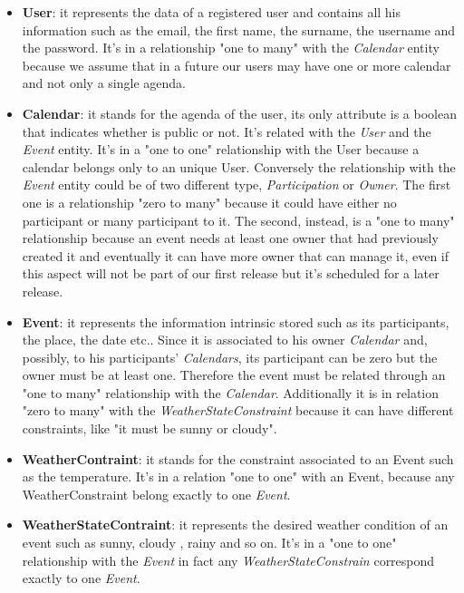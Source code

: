 \begin{itemize}
\item{\bf User}: it represents the data of a registered user and contains all his information such as the email, the first name, the surname, the username and the password. It's in a relationship "one to many" with the \textit{Calendar} entity because we assume that in a future our users may have one or more calendar and not only a single agenda.
\item{\bf Calendar}: it stands for the agenda of the user, its only attribute is a boolean that indicates whether is public or not. It's related with the \textit{User} and the \textit{Event} entity. It's in a "one to one" relationship with the User because a calendar belongs only to an unique User. Conversely the relationship with the \textit{Event} entity could be of two different type, \textit{Participation} or \textit{Owner}. The first one is a relationship "zero to many" because it could have either no participant or many participant to it. The second, instead, is a "one to many" relationship because an event needs at least one owner that had previously created it and eventually it can have more owner that can manage it, even if this aspect will not be part of our first release but it's scheduled for a later release.
\item{\bf Event}: it represents the information intrinsic stored such as its participants, the place, the date etc.. Since it is associated to his owner \textit{Calendar} and, possibly, to his participants' \textit{Calendars}, its participant can be zero but the owner must be at least one. Therefore the event must be related through an "one to many" relationship with the \textit{Calendar}. Additionally it is in relation "zero to many" with the \textit{WeatherStateConstraint} because it can have different constraints, like "it must be sunny or cloudy".
\item{\bf WeatherContraint}: it stands for the constraint associated to an Event such as the temperature. It's in a relation "one to one" with an Event, because any WeatherConstraint belong exactly to one {\it Event}.
\item{\bf WeatherStateContraint}: it represents the desired weather condition of an event such as sunny, cloudy , rainy and so on. It's in a "one to one" relationship with the {\it Event} in fact any {\it WeatherStateConstrain} correspond exactly to one {\it Event}.
\end{itemize}
